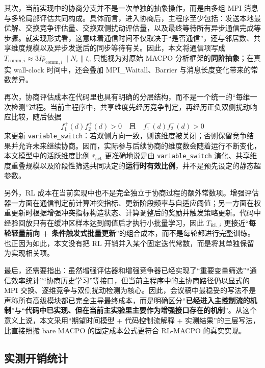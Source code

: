 \documentclass[conference]{IEEEtran}
\begin{document}
其次，当前实现中的协商分支并不是一次单独的抽象操作，而是由多组 MPI 消息与多轮局部评估共同构成。具体而言，进入协商后，主程序至少包括：发送本地最优解、交换竞争评估量、交换双侧扰动评估量，以及最终等待所有异步通信完成等步骤。就实现形式看，这意味着通信时间不仅取决于“是否通信”，还与邻居数、共享维度规模以及异步发送后的同步等待有关。因此，本文将通信项写成 $T_{\mathrm{comm},i}\approx 3I\bar p_{\mathrm{comm},i}\lVert N_i\rVert t_c$ 只能视为对原始 MACPO 分析框架的\textbf{同阶抽象}；在真实 wall-clock 时间中，还会叠加 MPI\_Waitall、Barrier 与消息长度变化带来的常数差异。

再次，协商评估成本在代码里也具有明确的分层结构，而不是一个统一的“每维一次检测”过程。当前主程序中，共享维度先经历竞争判定，再经历正负双侧扰动响应比较，随后依据
\[
f_{1}^{+}(d)f_{2}^{+}(d)>0\quad\text{且}\quad f_{1}^{-}(d)f_{2}^{-}(d)>0
\]
来更新 \texttt{variable\_switch}：若双侧方向一致，则该维度被关闭；否则保留竞争结果并允许未来继续协商。因而，实际参与后续协商的维度数会随着运行不断变化，本文模型中的活跃维度比例 $\bar r_{\mathrm{act}}$ 更准确地说是由 \texttt{variable\_switch} 演化、共享维度重叠规模以及阶段性筛选共同决定的\textbf{运行时有效比例}，并不是预先设定的静态超参数。

另外，RL 成本在当前实现中也不是完全独立于协商过程的额外常数项。增强评估器一方面在通信判定前计算冲突指标、更新阶段频率与自适应阈值；另一方面在权重更新时根据增强冲突指标构造状态、计算调整后的奖励并触发策略更新。代码中经验回放只有在缓冲区样本达到阈值后才执行小批量学习，因此 $T_{\mathrm{RL},i}$ 更接近“\textbf{每轮轻量前向 + 条件触发式批量更新}”的组合成本，而不是每轮都进行完整训练。也正因为如此，本文没有把 RL 开销并入某个固定迭代常数，而是将其单独保留为实现相关项。

最后，还需要指出：虽然增强评估器和增强竞争器已经实现了“重要变量筛选”“通信效率统计”“协商历史学习”等接口，但当前主程序中的主协商路径仍以显式的 MPI 交换、逐维竞争与双侧扰动检测为核心。因此，会议稿中最稳妥的写法不是声称所有高级模块都已完全主导最终成本，而是明确区分“\textbf{已经进入主控制流的机制}”与“\textbf{代码中已实现、但在当前主实验里主要作为增强接口存在的机制}”。从这个意义上说，本文采用“期望时间模型 + 代码控制流解释 + 实测结果”的三层写法，比直接照搬 bare MACPO 的固定成本公式更符合 RL-MACPO 的真实实现。

\subsection{实测开销统计}
\end{document}
